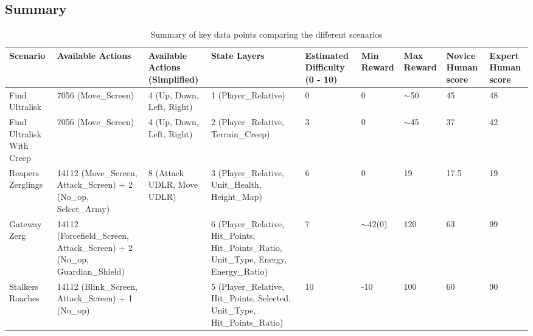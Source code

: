 \subsection{Summary}
\begin{landscape}
\begin{table}[htb]
\centering
\begin{tabular}{p{2cm}p{3cm}p{3cm}p{3cm}p{2cm}p{1.5cm}p{1.5cm}p{2cm}p{2cm}}
\toprule
Scenario               & Available Actions                                                         & Available Actions (Simplified) & State Layers                                                                             & Estimated Difficulty (0 - 10) & Min Reward  & Max Reward & Novice Human score & Expert Human score \\ \midrule
Find Ultralisk          & 7056 (Move\_Screen)                                                       & 4 (Up, Down, Left, Right)     & 1 (Player\_Relative)                                                                     & 0           & 0           & $\sim$50   & 45                     & 48                       \\  \addlinespace[0.35em]
Find Ultralisk With Creep & 7056 (Move\_Screen)                                                       & 4 (Up, Down, Left, Right)     & 2 (Player\_Relative, Terrain\_Creep)                                                     & 3     & 0           & $\sim$45   & 37                     & 42                       \\ \addlinespace[0.35em]
Reapers Zerglings       & 14112 (Move\_Screen, Attack\_Screen) + 2 (No\_op, Select\_Army)           & 8 (Attack UDLR, Move UDLR)    & 3 (Player\_Relative, Unit\_Health, Height\_Map)                                          & 6         & 0           & 19         & 17.5                   & 19                       \\ \addlinespace[0.35em]
Gateway Zerg            & 14112 (Forcefield\_Screen, Attack\_Screen) + 2 (No\_op, Guardian\_Shield) &                               & 6 (Player\_Relative, Hit\_Points, Hit\_Points\_Ratio, Unit\_Type, Energy, Energy\_Ratio) & 7            & $\sim$42(0) & 120        & 63                     & 99                       \\ \addlinespace[0.35em]
Stalkers Roaches        & 14112 (Blink\_Screen, Attack\_Screen) + 1 (No\_op)                        &                               & 5 (Player\_Relative, Hit\_Points, Selected, Unit\_Type, Hit\_Points\_Ratio)              & 10       & -10         & 100        & 60                     & 90                       \\ \bottomrule
\end{tabular}%
\caption{Summary of key data points comparing the different scenarios}
\label{table:scen_summ}
\end{table}
\end{landscape}

